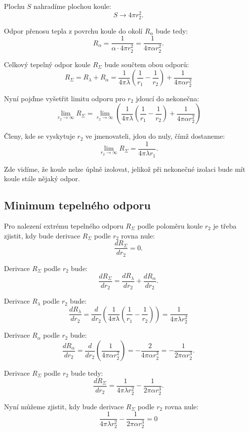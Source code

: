 \documentclass{article}
\begin{document}
Plochu $S$ nahradíme plochou koule:
$$
    S \rightarrow 4 \pi r_2^2.
$$

Odpor přenosu tepla z povrchu koule do okolí $R_{\alpha}$ bude tedy:
$$
    R_{\alpha} = \frac{1}{\alpha \cdot 4 \pi r_2^2} = \frac{1}{4 \pi \alpha r_2^2}.
$$

Celkový tepelný odpor koule $R_{\Sigma}$ bude součtem obou odporů:
$$
    R_{\Sigma} = R_{\lambda} + R_{\alpha} = \frac{1}{4 \pi \lambda} \left( \frac{1}{r_1} - \frac{1}{r_2} \right) + \frac{1}{4 \pi \alpha r_2^2}
$$

Nyní pojďme vyšetřit limitu odporu pro $r_2$ jdoucí do nekonečna:
$$
    \lim_{r_2 \to \infty} R_{\Sigma} = \lim_{r_2 \to \infty} \left( \frac{1}{4 \pi \lambda} \left( \frac{1}{r_1} - \frac{1}{r_2} \right) + \frac{1}{4 \pi \alpha r_2^2} \right)
$$

Členy, kde se vyskytuje $r_2$ ve jmenovateli, jdou do nuly, čímž dostaneme:
$$
    \lim_{r_2 \to \infty} R_{\Sigma} = \frac{1}{4 \pi \lambda r_1}.
$$

Zde vidíme, že koule nelze úplně izolovat, jelikož při nekonečné izolaci bude mít koule stále nějaký odpor.


\subsection{Minimum tepelného odporu}

Pro nalezení extrému tepelného odporu $R_{\Sigma}$ podle poloměru koule $r_2$ je třeba zjistit, kdy bude derivace $R_{\Sigma}$ podle $r_2$ rovna nule:
$$
    \frac{dR_{\Sigma}}{dr_2} = 0.
$$

Derivace $R_{\Sigma}$ podle $r_2$ bude:
$$
    \frac{dR_{\Sigma}}{dr_2} = \frac{dR_{\lambda}}{dr_2} + \frac{dR_{\alpha}}{dr_2}.
$$

Derivace $R_{\lambda}$ podle $r_2$ bude:
$$
    \frac{dR_{\lambda}}{dr_2} = \frac{d}{dr_2} \left( \frac{1}{4 \pi \lambda} \left( \frac{1}{r_1} - \frac{1}{r_2} \right) \right) = \frac{1}{4 \pi \lambda r_2^2}
$$

Derivace $R_{\alpha}$ podle $r_2$ bude:
$$
    \frac{dR_{\alpha}}{dr_2} = \frac{d}{dr_2} \left( \frac{1}{4 \pi \alpha r_2^2} \right) = -\frac{2}{4 \pi \alpha r_2^3} = -\frac{1}{2 \pi \alpha r_2^3}.
$$

Derivace $R_{\Sigma}$ podle $r_2$ bude tedy:
$$
    \frac{dR_{\Sigma}}{dr_2} = \frac{1}{4 \pi \lambda r_2^2} - \frac{1}{2 \pi \alpha r_2^3}.
$$

Nyní můžeme zjistit, kdy bude derivace $R_{\Sigma}$ podle $r_2$ rovna nule:
$$
    \frac{1}{4 \pi \lambda r_2^2} - \frac{1}{2 \pi \alpha r_2^3} = 0
$$
\end{document}

